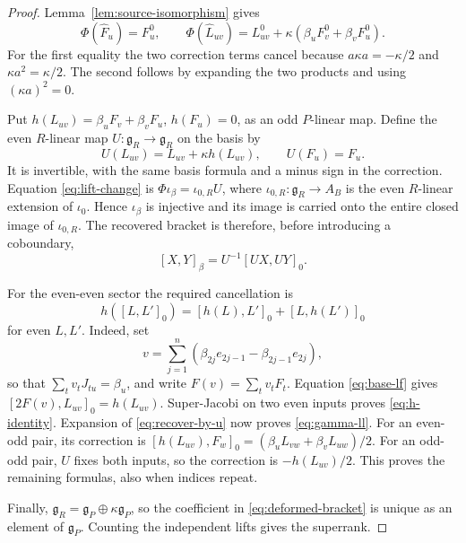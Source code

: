 \documentclass[11pt]{article}
\numberwithin{equation}{section}
\theoremstyle{remark}
\begin{document}
\begin{proof}
Lemma~\ref{lem:source-isomorphism} gives
\begin{equation}\label{eq:lift-change}
 \Phi(\widehat F_u)=F^0_u,\qquad
 \Phi(\widehat L_{uv})=L^0_{uv}+\kappa(\beta_uF^0_v+\beta_vF^0_u).
\end{equation}
For the first equality the two correction terms cancel because
$a\kappa a=-\kappa/2$ and $\kappa a^2=\kappa/2$.
The second follows by expanding the two products and using $(\kappa a)^2=0$.

Put $h(L_{uv})=\beta_uF_v+\beta_vF_u$, $h(F_u)=0$, as an odd
$P$-linear map. Define the even $R$-linear map
$U:\mathfrak g_R\to\mathfrak g_R$ on the basis by
\[
 U(L_{uv})=L_{uv}+\kappa h(L_{uv}),\qquad U(F_u)=F_u.
\]
It is invertible, with the same basis formula and a minus sign in the correction.
Equation \eqref{eq:lift-change} is
$\Phi\iota_\beta=\iota_{0,R}U$, where
$\iota_{0,R}:\mathfrak g_R\to A_B$ is the even $R$-linear extension of
$\iota_0$. Hence $\iota_\beta$ is injective and its
image is carried onto the entire closed image of $\iota_{0,R}$.
The recovered bracket is therefore, before introducing a coboundary,
\begin{equation}\label{eq:recover-by-u}
 [X,Y]_\beta=U^{-1}[UX,UY]_0.
\end{equation}

For the even-even sector the required cancellation is
\begin{equation}\label{eq:h-identity}
 h([L,L']_0)=[h(L),L']_0+[L,h(L')]_0
\end{equation}
for even $L,L'$. Indeed, set
\begin{equation}\label{eq:v}
 v=\sum_{j=1}^n(\beta_{2j}e_{2j-1}-\beta_{2j-1}e_{2j}),
\end{equation}
so that $\sum_t v_tJ_{tu}=\beta_u$, and write $F(v)=\sum_t v_tF_t$.
Equation \eqref{eq:base-lf} gives
$[2F(v),L_{uv}]_0=h(L_{uv})$. Super-Jacobi on two even inputs proves
\eqref{eq:h-identity}. Expansion of \eqref{eq:recover-by-u} now proves
\eqref{eq:gamma-ll}. For an even-odd pair, its correction is
$[h(L_{uv}),F_w]_0=(\beta_uL_{vw}+\beta_vL_{uw})/2$.
For an odd-odd pair, $U$ fixes both inputs, so the correction is
$-h(L_{uv})/2$. This proves the remaining formulas, also when indices repeat.

Finally, $\mathfrak g_R=\mathfrak g_P\oplus\kappa\mathfrak g_P$, so the
coefficient in \eqref{eq:deformed-bracket} is unique as an element of
$\mathfrak g_P$. Counting the independent lifts gives the superrank.
\end{proof}
\end{document}
